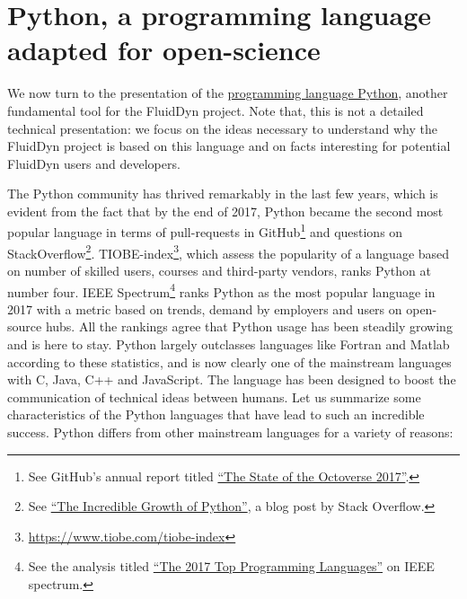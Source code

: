 \section{Python, a programming language adapted for open-science}

We now turn to the presentation of the
\href{https://www.python.org/}{programming language Python}, another
fundamental tool for the FluidDyn project. Note that, this is not a detailed
technical presentation: we focus on the ideas necessary to understand why the
FluidDyn project is based on this language and on facts interesting for
potential FluidDyn users and developers.

The Python community has thrived remarkably in the last few years, which is
evident from the fact that by the end of 2017, Python became the second most
popular language in terms of pull-requests in GitHub\footnote{See GitHub's
	annual report titled \href{https://octoverse.github.com/}{ ``The State
of the Octoverse 2017''}.} and questions on StackOverflow\footnote{See
\href{https://stackoverflow.blog/2017/09/06/incredible-growth-python/}{ ``The
Incredible Growth of Python''}, a blog post by Stack Overflow.}.
%
TIOBE-index\footnote{\url{https://www.tiobe.com/tiobe-index}}, which assess the
popularity of a language based on number of skilled users, courses and
third-party vendors, ranks Python at number four. IEEE Spectrum\footnote{See
	the analysis titled
	\href{https://spectrum.ieee.org/computing/software/%
the-2017-top-programming-languages}{``The 2017 Top Programming Languages''} on
IEEE spectrum.} ranks Python as the most popular language in 2017 with a metric
based on trends, demand by employers and users on open-source hubs.  All the
rankings agree that Python usage has been steadily growing and is here to stay.
Python largely outclasses languages like Fortran and Matlab according to these
statistics, and is now clearly one of the mainstream languages with C, Java,
C++ and JavaScript.
%
The language has been designed to boost the communication of technical ideas
between humans. 
%
Let us summarize some characteristics of the Python languages that have lead to
such an incredible success.
%
Python differs from other mainstream languages for a variety of reasons:


